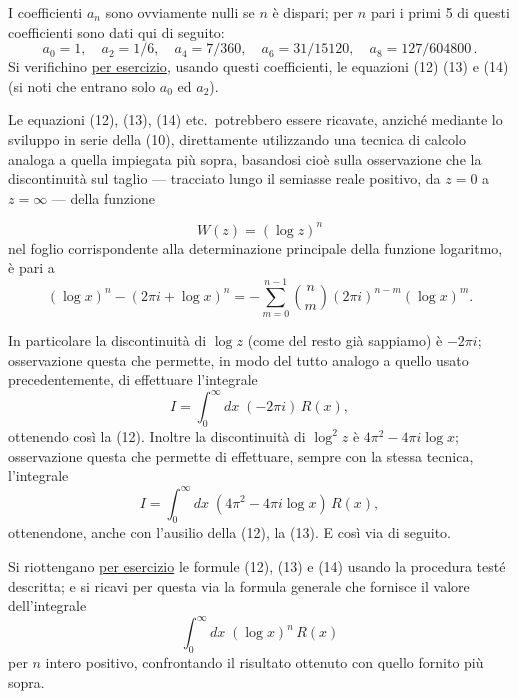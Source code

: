 \documentclass[11pt, a4paper]{book}
\numberwithin{equation}{section}
\begin{document}
I coefficienti $a_n$ sono ovviamente nulli se $n$ è dispari; per $n$ pari
i primi 5 di questi coefficienti sono dati qui di seguito:
\[
    a_0 = 1,\quad a_2 = 1/6,\quad a_4 = 7/360,\quad a_6 = 31/15120,\quad
    a_8 = 127/604800\,.
\]
Si verifichino \underline{per esercizio}, usando questi coefficienti, le equazioni
(12) (13) e (14) (si noti che entrano solo $a_0$ ed $a_2$).

\medskip
Le equazioni (12), (13), (14) etc.\ potrebbero essere ricavate, anziché
mediante lo sviluppo in serie della (10), direttamente utilizzando una tecnica
di calcolo analoga a quella impiegata più sopra, basandosi cioè sulla osservazione
che la discontinuità sul taglio --- tracciato lungo il semiasse reale positivo,
da $z=0$ a $z=\infty$ --- della funzione


\begin{equation}
    W(z) = \left(\log z\right)^n \tag{15}
\end{equation}
nel foglio corrispondente alla determinazione principale della funzione logaritmo,
è pari a
\begin{equation}
    (\log x)^n - (2\pi i + \log x)^n
    = -\sum_{m=0}^{n-1} \binom{n}{m} (2\pi i)^{n-m} (\log x)^m. \tag{16}
\end{equation}

In particolare la discontinuità di $\log z$ (come del resto già sappiamo)
è $-2\pi i$; osservazione questa che permette, in modo del tutto analogo a
quello usato precedentemente, di effettuare l'integrale
\begin{equation}
    I = \int_0^\infty dx\; (-2\pi i)\, R(x), \tag{17}
\end{equation}
ottenendo così la (12). Inoltre la discontinuità di $\log^2 z$ è
$4\pi^2 - 4\pi i \log x$; osservazione questa che permette di effettuare,
sempre con la stessa tecnica, l'integrale
\begin{equation}
    I = \int_0^\infty dx\; (4\pi^2 - 4\pi i \log x)\, R(x), \tag{18}
\end{equation}
ottenendone, anche con l'ausilio della (12), la (13). E così via di seguito.

\medskip
Si riottengano \underline{per esercizio} le formule (12), (13) e (14) usando la
procedura testé descritta; e si ricavi per questa via la formula generale che
fornisce il valore dell'integrale
\[
    \int_0^\infty dx\; (\log x)^n\, R(x)
\]
per $n$ intero positivo, confrontando il risultato ottenuto con quello fornito
più sopra.
\end{document}
